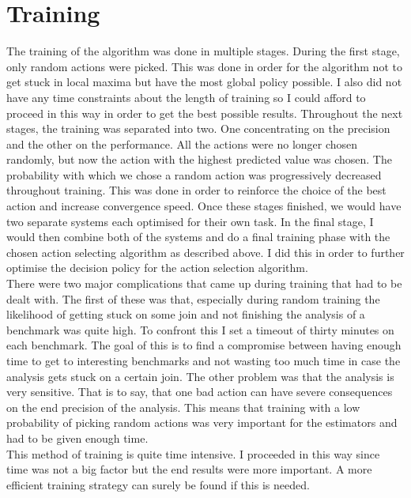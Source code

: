 \section{Training}

The training of the algorithm was done in multiple stages. During the first stage, only random actions were picked. This was done in order for the algorithm not to get stuck in local maxima but have the most global policy possible. I also did not have any time constraints about the length of training so I could afford to proceed in this way in order to get the best possible results. Throughout the next stages, the training was separated into two. One concentrating on the precision and the other on the performance. All the actions were no longer chosen randomly, but now the action with the highest predicted value was chosen. The probability with which we chose a random action was progressively decreased throughout training. This was done in order to reinforce the choice of the best action and increase convergence speed. Once these stages finished, we would have two separate systems each optimised for their own task. In the final stage, I would then combine both of the systems and do a final training phase with the chosen action selecting algorithm as described above. I did this in order to further optimise the decision policy for the action selection algorithm.\\
There were two major complications that came up during training that had to be dealt with. The first of these was that, especially during random training the likelihood of getting stuck on some join and not finishing the analysis of a benchmark was quite high. To confront this I set a timeout of thirty minutes on each benchmark. The goal of this is to find a compromise between having enough time to get to interesting benchmarks and not wasting too much time in case the analysis gets stuck on a certain join. The other problem was that the analysis is very sensitive. That is to say, that one bad action can have severe consequences on the end precision of the analysis. This means that training with a low probability of picking random actions was very important for the estimators and had to be given enough time.\\
This method of training is quite time intensive. I proceeded in this way since time was not a big factor but the end results were more important. A more efficient training strategy can surely be found if this is needed.



















